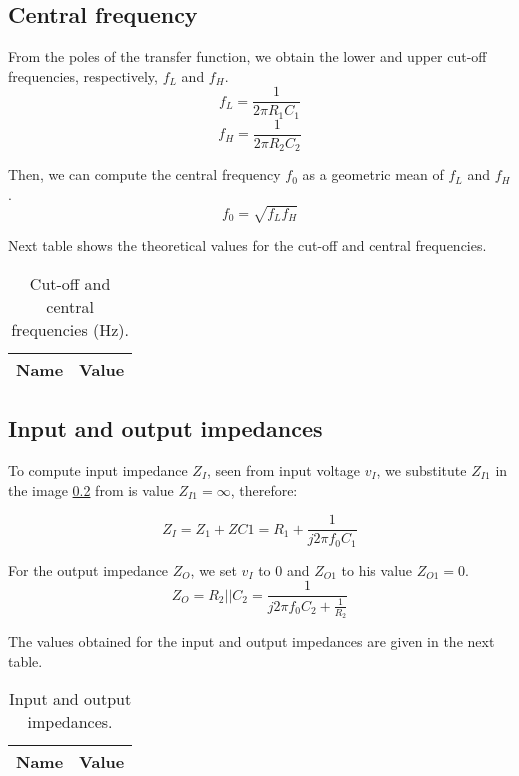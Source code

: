 \subsection{Central frequency}
 \par From the poles of the transfer function, we obtain the lower and upper cut-off frequencies, respectively, $f_L$ and $f_H$.
 \begin{equation}
 f_L=\frac{1}{2\pi R_1C_1}
 \end{equation}
 \begin{equation}
 f_H=\frac{1}{2\pi R_2C_2}
 \end{equation}
 \par Then, we can compute the central frequency $f_0$ as a geometric mean of $f_L$ and $f_H$.
 \begin{equation}
 f_0=\sqrt{f_Lf_H}
 \end{equation}
 
 \par Next table shows the theoretical values for the cut-off and central frequencies.
 \begin{table}[H]
    \centering
    \begin{tabular}{|l|r|}
    \hline    
    {\bf Name} & {\bf Value} \\ \hline
    
    \end{tabular}
     \caption{Cut-off and central frequencies (Hz).}
    \label{tab:freq}
  \end{table}

 
 
 \subsection{Input and output impedances}
 \par To compute input impedance $Z_I$, seen from input voltage $v_I$, we substitute $Z_{I1}$ in the image \ref{} from is value $Z_{I1}=\infty$, therefore:
 
 \begin{equation}
 Z_I=Z_1+Z{C1}=R_1+\frac{1}{j2\pi f_0C_1}
 \end{equation}
\par For the output impedance $Z_{O}$, we set $v_I$ to $0$ and $Z_{O1}$ to his value $Z_{O1}=0$.
\begin{equation}
Z_O=R_2||C_2=\frac{1}{j2\pi f_0C_2+\frac{1}{R_2}}
\end{equation}

\par The values obtained for the input and output impedances are given in the next table.

\begin{table}[H]
    \centering
    \begin{tabular}{|l|r|}
    \hline    
    {\bf Name} & {\bf Value} \\ \hline
    
    \end{tabular}
     \caption{Input and output impedances.}
    \label{tab:freq}
  \end{table}



  
 


 
 
